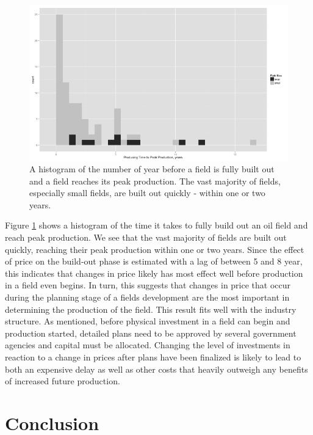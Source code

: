\documentclass[12pt]{article}
\begin{document}
\begin{figure}
	\includegraphics[width=1\textwidth]{figures/field_time_to_peak_print.png}
	\caption{A histogram of the number of year before a field is fully built out and a field reaches its peak production.  The vast majority of fields, especially small fields, are built out quickly - within one or two years.}
	\label{gam_buildout_hist}
\end{figure}

Figure \ref{gam_buildout_hist} shows a histogram of the time it takes to fully build out an oil field and reach peak production.  We see that the vast majority of fields are built out quickly, reaching their peak production within one or two years.  Since the effect of price on the build-out phase is estimated with a lag of between 5 and 8 year, this indicates that changes in price likely has most effect well before production in a field even begins.  In turn, this suggests that changes in price that occur during the planning stage of a fields development are the most important in determining the production of the field.  This result fits well with the industry structure.  As mentioned, before physical investment in a field can begin and production started, detailed plans need to be approved by several government agencies and capital must be allocated.  Changing the level of investments in reaction to a change in prices after plans have been finalized is likely to lead to both an expensive delay as well as other costs that heavily outweigh any benefits of increased future production.  




\section{Conclusion}
\end{document}
